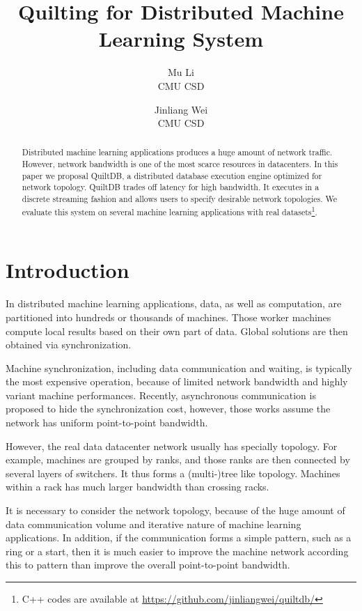 \documentclass{acm_proc_article-sp}
\title{Quilting for Distributed Machine Learning System}
\author{Mu Li \\ CMU CSD \and Jinliang Wei\\ CMU CSD}
\begin{document}
\maketitle

\begin{abstract}
  Distributed machine learning applications produces a huge amount of network
  traffic. However, network bandwidth is one of the most scarce resources in
  datacenters.  In this paper we proposal QuiltDB, a distributed database
  execution engine optimized for network topology. QuiltDB trades off latency
  for high bandwidth. It executes in a discrete streaming fashion and allows
  users to specify desirable network topologies. We evaluate this system on
  several machine learning applications with real datasets\footnote{C++ codes
    are available at \url{https://github.com/jinliangwei/quiltdb/}}.
\end{abstract}

\section{Introduction}

In distributed machine learning applications, data,  as well as computation, are
partitioned into hundreds or  thousands of machines. Those
worker machines compute local results based on their own part of data. Global solutions
are then obtained via synchronization.

Machine synchronization, including data communication and waiting, is typically
the most expensive operation, because of limited network bandwidth and highly
variant machine performances. Recently, asynchronous communication is proposed
to hide the synchronization cost, however, those works assume the network has
uniform point-to-point bandwidth.

However, the real data datacenter network usually has specially topology. For
example, machines are grouped by ranks, and those ranks are then connected by
several layers of switchers. It thus forms a (multi-)tree like
topology. Machines within a rack has much larger bandwidth than crossing racks.

It is necessary to consider the network topology, because of the huge amount of
data communication volume and iterative nature of  machine learning
applications. In addition, if the communication forms a simple pattern, such as
a ring or a start, then it is much easier to improve the machine network
according this to pattern than improve the overall point-to-point bandwidth.
\end{document}
